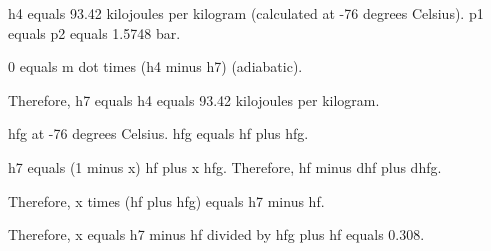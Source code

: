 h4 equals 93.42 kilojoules per kilogram (calculated at -76 degrees Celsius).  
p1 equals p2 equals 1.5748 bar.  

0 equals m dot times (h4 minus h7) (adiabatic).  

Therefore, h7 equals h4 equals 93.42 kilojoules per kilogram.  

hfg at -76 degrees Celsius. hfg equals hf plus hfg.  

h7 equals (1 minus x) hf plus x hfg. Therefore, hf minus dhf plus dhfg.  

Therefore, x times (hf plus hfg) equals h7 minus hf.  

Therefore, x equals h7 minus hf divided by hfg plus hf equals 0.308.